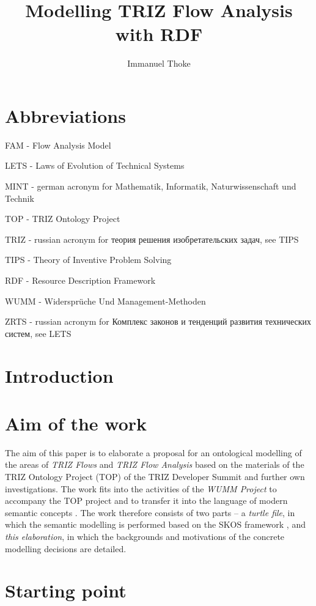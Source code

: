 \documentclass[a4paper,11pt]{article}
\author{Immanuel Thoke}
\title{Modelling TRIZ Flow Analysis with RDF}
\begin{document}
    \maketitle
    \tableofcontents
    \section{Abbreviations}
    FAM - Flow Analysis Model

    LETS - Laws of Evolution of Technical Systems

    MINT - german acronym for Mathematik, Informatik, Naturwissenschaft und Technik

    TOP - TRIZ Ontology Project

    TRIZ - russian acronym for \foreignlanguage{russian}{теория решения изобретательских задач}, see TIPS

    TIPS - Theory of Inventive Problem Solving 

    RDF - Resource Description Framework 

    WUMM - Widersprüche Und Management-Methoden

    ZRTS - russian acronym for \foreignlanguage{russian}{Комплекс законов и тенденций развития технических систем}, see LETS

    \section{Introduction}

    \section{Aim of the work}

    The aim of this paper is to elaborate a proposal for an ontological modelling
    of the areas of \emph{TRIZ Flows} and \emph{TRIZ Flow Analysis} based on the
    materials of the TRIZ Ontology Project (TOP) of the TRIZ Developer Summit
    \cite{TOP} and further own investigations. The work fits into the activities
    of the \emph{WUMM Project} \cite{WUMM} to accompany the TOP project and to
    transfer it into the language of modern semantic concepts
    \cite{WUMMTOP}.  The work therefore consists of two parts -- a
    \emph{turtle file}, in which the semantic modelling is performed based on the
    SKOS framework \cite{SKOS}, and \emph{this elaboration}, in which the
    backgrounds and motivations of the concrete modelling decisions are detailed.

    \section{Starting point} 
\end{document}
